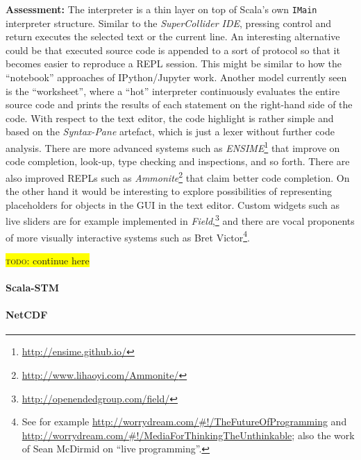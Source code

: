 \documentclass[11pt,a4paper]{article}
\newcommand{\todo}[1]{\colorbox{yellow}{\textsc{todo}: #1}}
\newcommand{\software}[1]{\textit{#1}}
\begin{document}
\textbf{Assessment:} The interpreter is a thin layer on top of Scala's own \verb!IMain! interpreter structure. Similar to the \software{SuperCollider IDE}, pressing control and return executes the selected text or the current line. An interesting alternative could be that executed source code is appended to a sort of protocol so that it becomes easier to reproduce a REPL session. This might be similar to how the ``notebook'' approaches of IPython/Jupyter work. Another model currently seen is the ``worksheet'', where a ``hot'' interpreter continuously evaluates the entire source code and prints the results of each statement on the right-hand side of the code. With respect to the text editor, the code highlight is rather simple and based on the \software{Syntax-Pane} artefact, which is just a lexer without further code analysis. There are more advanced systems such as \software{ENSIME}\footnote{\url{http://ensime.github.io/}} that improve on code completion, look-up, type checking and inspections, and so forth. There are also improved REPLs such as \software{Ammonite}\footnote{\url{http://www.lihaoyi.com/Ammonite/}} that claim better code completion. On the other hand it would be interesting to explore possibilities of representing placeholders for objects in the GUI in the text editor. Custom widgets such as live sliders are for example implemented in \software{Field},\footnote{\url{http://openendedgroup.com/field/}} and there are vocal proponents of more visually interactive systems such as Bret Victor\footnote{See for example \url{http://worrydream.com/\#!/TheFutureOfProgramming} and \url{http://worrydream.com/\#!/MediaForThinkingTheUnthinkable}; 
also the work of Sean McDirmid on ``live programming''.}.

%

\todo{continue here}

\paragraph{Scala-STM}

\paragraph{NetCDF}
\end{document}
